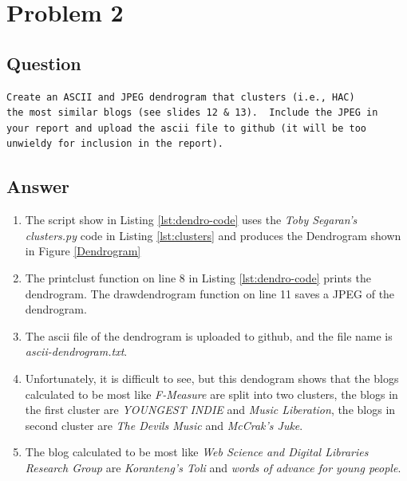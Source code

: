 \section{Problem 2}
\label{part2}
\subsection*{Question}
\begingroup
\begin{verbatim}
Create an ASCII and JPEG dendrogram that clusters (i.e., HAC)
the most similar blogs (see slides 12 & 13).  Include the JPEG in
your report and upload the ascii file to github (it will be too
unwieldy for inclusion in the report).
\end{verbatim}
\subsection{Answer}
\begin{enumerate}
\item The script show in Listing \ref{lst:dendro-code} uses the \emph{Toby Segaran's clusters.py} code in Listing \ref{lst:clusters} and produces the Dendrogram shown in Figure \ref{Dendrogram}

\item The printclust function on line 8 in Listing \ref{lst:dendro-code} prints the dendrogram. The drawdendrogram function on line 11 saves a JPEG of the dendrogram.

\item The ascii file of the dendrogram is uploaded to github, and the file name is \emph{ascii-dendrogram.txt}.

\item Unfortunately, it is difficult to see, but this dendogram shows that the blogs calculated to be most like \emph{F-Measure} are split into two clusters, the blogs in the first cluster are \emph{YOUNGEST INDIE} and \emph{Music Liberation}, the blogs in second cluster are \emph{The Devils Music} and \emph{McCrak's Juke}. 
\item The blog calculated to be most like \emph{Web Science and Digital Libraries Research Group} are \emph{Koranteng's Toli} and \emph{words of advance for young people}.
\end{enumerate}




\newpage
\clearpage

